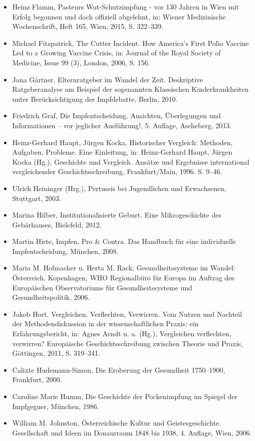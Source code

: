 \documentclass[
    a4paper,
    12pt,
    hyphens,
    chapterprefix=true,
    headheight=33pt,
    footheight=29pt,
    headings=optiontohead,
]{scrartcl}
\begin{document}
{\begin{itemize}
\item{Heinz Flamm, Pasteurs Wut-Schutzimpfung - vor 130 Jahren in Wien mit Erfolg begonnen und doch offiziell abgelehnt, in: Wiener Medizinische Wochenschrift, Heft 165, Wien, 2015, S. 322--339.}
\item{Michael Fitzpatrick, The Cutter Incident. How America's First Polio Vaccine Led to a Growing Vaccine Crisis, in: Journal of the Royal Society of Medicine, Issue 99 (3), London, 2006, S. 156.}
\item{Jana Gärtner, Elternratgeber im Wandel der Zeit. Deskriptive Ratgeberanalyse am Beispiel der sogenannten Klassischen Kinderkrankheiten unter Berücksichtigung der Impfdebatte, Berlin, 2010.}
\item{Friedrich Graf, Die Impfentscheidung. Ansichten, Überlegungen und Informationen -- vor jeglicher Ausführung!, 5. Auflage, Ascheberg, 2013.}
\item{Heinz-Gerhard Haupt, Jürgen Kocka, Historischer Vergleich: Methoden, Aufgaben, Probleme. Eine Einleitung, in: Heinz-Gerhard Haupt, Jürgen Kocka (Hg.), Geschichte und Vergleich. Ansätze und Ergebnisse international vergleichender Geschichtsschreibung, Frankfurt/Main, 1996. S. 9--46.}
\item{Ulrich Heininger (Hrg.), Pertussis bei Jugendlichen und Erwachsenen, Stuttgart, 2003.}
\item{Marina Hilber, Institutionalisierte Geburt. Eine Mikrogeschichte des Gebärhauses, Bielefeld, 2012.}
\item{Martin Hirte, Impfen, Pro \& Contra. Das Handbuch für eine individuelle Impfentscheidung, München, 2008.}
\item{Maria M. Hofmacher u. Herta M. Rack, Gesundheitssysteme im Wandel: Österreich. Kopenhagen, WHO Regionalbüro für Europa im Auftrag des Europäischen Observatoriums für Gesundheitssysteme und Gesundheitspolitik, 2006.}

\item{Jakob Hort, Vergleichen, Verflechten, Verwirren. Vom Nutzen und Nachteil der Methodendiskussion in der wissenschaftlichen Praxis: ein Erfahrungsbericht, in: Agnes Arndt u. a. (Hg.), Vergleichen verflechten, verwirren? Europäische  Geschichtsschreibung zwischen Theorie und Praxis, Göttingen, 2011, S. 319--341.}
\item{Calixte Hudemann-Simon, Die Eroberung der Gesundheit 1750--1900, Frankfurt, 2000.}
\item{Caroline Marie Humm, Die Geschichte der Pockenimpfung im Spiegel der Impfgegner, München, 1986.}
\item{William M. Johnston, Österreichische Kultur und Geistesgeschichte. Gesellschaft und Ideen im Donaurraum 1848 bis 1938, 4. Auflage, Wien, 2006.}


\end{itemize}}
\end{document}
